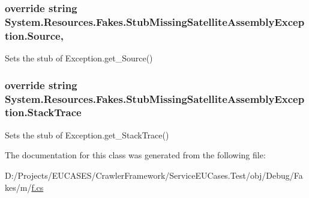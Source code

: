 \hypertarget{class_system_1_1_resources_1_1_fakes_1_1_stub_missing_satellite_assembly_exception_a7bea3b9f18181441c7e9a3e88226ce0c}{
\subsubsection[{Source}]{\setlength{\rightskip}{0pt plus 5cm}override string System.\-Resources.\-Fakes.\-Stub\-Missing\-Satellite\-Assembly\-Exception.\-Source\hspace{0.3cm}{\ttfamily [get]}, {\ttfamily [set]}}}\label{class_system_1_1_resources_1_1_fakes_1_1_stub_missing_satellite_assembly_exception_a7bea3b9f18181441c7e9a3e88226ce0c}


Sets the stub of Exception.\-get\-\_\-\-Source()

\hypertarget{class_system_1_1_resources_1_1_fakes_1_1_stub_missing_satellite_assembly_exception_aabed52c1030daa594e5df2e39bb4f52c}{
\subsubsection[{Stack\-Trace}]{\setlength{\rightskip}{0pt plus 5cm}override string System.\-Resources.\-Fakes.\-Stub\-Missing\-Satellite\-Assembly\-Exception.\-Stack\-Trace\hspace{0.3cm}{\ttfamily [get]}}}\label{class_system_1_1_resources_1_1_fakes_1_1_stub_missing_satellite_assembly_exception_aabed52c1030daa594e5df2e39bb4f52c}


Sets the stub of Exception.\-get\-\_\-\-Stack\-Trace()



The documentation for this class was generated from the following file\-:\begin{DoxyCompactItemize}
\item 
D\-:/\-Projects/\-E\-U\-C\-A\-S\-E\-S/\-Crawler\-Framework/\-Service\-E\-U\-Cases.\-Test/obj/\-Debug/\-Fakes/m/\hyperlink{m_2f_8cs}{f.\-cs}\end{DoxyCompactItemize}
